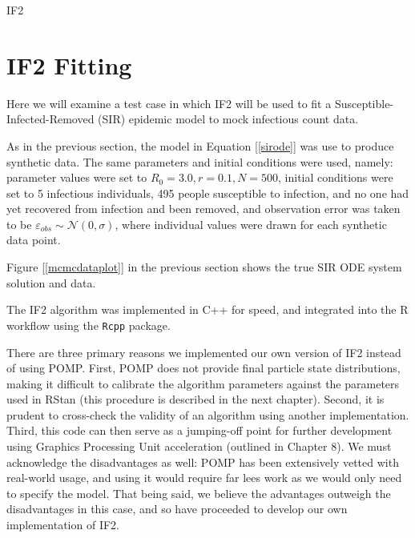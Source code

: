 \begin{algorithm}
{{	        }

	        \BlankLine


	    }

        \BlankLine


        \BlankLine

        \caption{IF2 \label{if2}}

    \end{algorithm}


\section{IF2 Fitting}

    Here we will examine a test case in which IF2 will be used to fit a Susceptible-Infected-Removed (SIR) epidemic model to mock infectious count data.

    As in the previous section, the model in Equation [\ref{sirode}] was use to produce synthetic data. The same parameters and initial conditions were used, namely: parameter values were set to $R_0 = 3.0, r = 0.1, N = 500$, initial conditions were set to 5 infectious individuals, 495 people susceptible to infection, and no one had yet recovered from infection and been removed, and observation error was taken to be $\varepsilon_{obs} \sim \mathcal{N}(0,\sigma)$, where individual values were drawn for each synthetic data point.

    Figure [\ref{mcmcdataplot}] in the previous section shows the true SIR ODE system solution and data.

    The IF2 algorithm was implemented in C++ for speed, and integrated into the R workflow using the \verb|Rcpp| package.

    There are three primary reasons we implemented our own version of IF2 instead of using POMP. First, POMP does not provide final particle state distributions, making it difficult to calibrate the algorithm parameters against the parameters used in RStan (this procedure is described in the next chapter). Second, it is prudent to cross-check the validity of an algorithm using another implementation. Third, this code can then serve as a jumping-off point for further development using Graphics Processing Unit acceleration (outlined in Chapter 8). We must acknowledge the disadvantages as well: POMP has been extensively vetted with real-world usage, and using it would require far lees work as we would only need to specify the model. That being said, we believe the advantages outweigh the disadvantages in this case, and so have proceeded to develop our own implementation of IF2.
	
